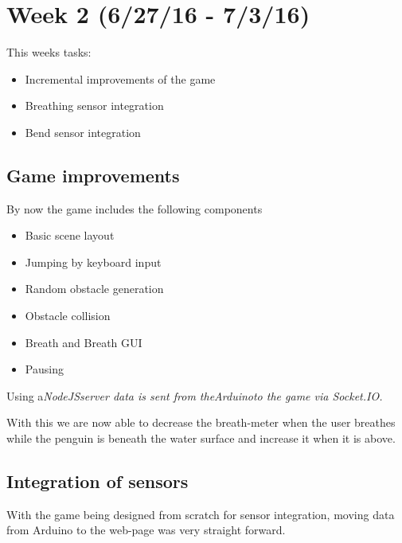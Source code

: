 \documentclass{article}
\begin{document}
\section{Week 2 (6/27/16 - 7/3/16)}
    This weeks tasks:
    \begin{itemize}
        \item Incremental improvements of the game
        \item Breathing sensor integration
        \item Bend sensor integration
    \end{itemize}

    \subsection{Game improvements}
        By now the game includes the following components
        \begin{itemize}
            \item Basic scene layout
            \item Jumping by keyboard input
            \item Random obstacle generation
            \item Obstacle collision
            \item Breath and Breath GUI
            \item Pausing
        \end{itemize}

        Using a\em NodeJS\em server data is sent from the\em Arduino\em to the game via \em Socket.IO\em.

        With this we are now able to decrease the breath-meter when the user breathes while the penguin is beneath the water surface and increase it when it is above.

        \begin{figure}
            \centering
            \qquad
        \end{figure}

    \subsection{Integration of sensors}
        With the game being designed from scratch for sensor integration, moving data from Arduino to the web-page was very straight forward.
\end{document}
